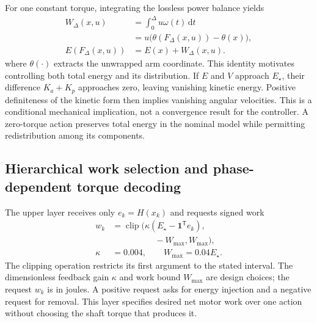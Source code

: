 \documentclass[letterpaper,10pt,conference]{ieeeconf}
\newcommand{\Estar}{E_{\star}}
\newcommand{\dd}{\mathrm{d}}
\begin{document}
For one constant torque, integrating the lossless power balance yields
\begin{equation}
\begin{aligned}
 W_\Delta(x,u)&=\int_0^\Delta u\omega(t)\,\dd t\\
 &=u\bigl(\theta(F_\Delta(x,u))-\theta(x)\bigr),\\
 E(F_\Delta(x,u))&=E(x)+W_\Delta(x,u).
\end{aligned}
\label{eq:work}
\end{equation}
where $\theta(\cdot)$ extracts the unwrapped arm coordinate. This identity motivates controlling both total energy and its distribution. If $E$ and $V$ approach $\Estar$, their difference $K_a+K_p$ approaches zero, leaving vanishing kinetic energy. Positive definiteness of the kinetic form then implies vanishing angular velocities. This is a conditional mechanical implication, not a convergence result for the controller. A zero-torque action preserves total energy in the nominal model while permitting redistribution among its components.

\subsection{Hierarchical work selection and phase-dependent torque decoding}
The upper layer receives only $e_k=H(x_k)$ and requests signed work
\begin{equation}
\begin{aligned}
 w_k&=\operatorname{clip}\!\bigl(\kappa(\Estar-\boldsymbol{1}^{\mathsf T}e_k),\\
    &\hspace{5em}-W_{\max},W_{\max}\bigr),\\
 \kappa&=0.004,\qquad W_{\max}=0.04\Estar.
\end{aligned}
\label{eq:workpolicy}
\end{equation}
The clipping operation restricts its first argument to the stated interval. The dimensionless feedback gain $\kappa$ and work bound $W_{\max}$ are design choices; the request $w_k$ is in joules. A positive request asks for energy injection and a negative request for removal. This layer specifies desired net motor work over one action without choosing the shaft torque that produces it.
\end{document}
